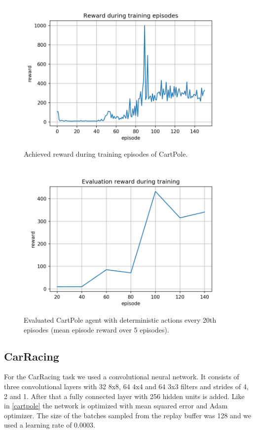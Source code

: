\documentclass[a4paper,12pt]{article}
\begin{document}
\begin{figure}[H]
	\centering \includegraphics[width=11.70cm, height=7.9cm]{plots/cartpole_episode_reward.png}
	\caption{
		\label{fig:cartpole_episode_reward}
		Achieved reward during training episodes of CartPole.
	}
\end{figure}

\begin{figure}[H]
	\centering \includegraphics[width=11.70cm, height=7.9cm]{plots/cartpole_evaluation_reward.png}
	\caption{
		\label{fig:cartpole_evaluation_reward}
		Evaluated CartPole agent with deterministic actions every 20th episodes (mean episode reward over 5 episodes).
	}
\end{figure}

\subsection{CarRacing}\label{carracing}

For the CarRacing task we used a convolutional neural network. It consists of three convolutional layers with 32 8x8, 64 4x4 and 64 3x3 filters and strides of 4, 2 and 1. After that a fully connected layer with 256 hidden units is added. Like in \autoref{cartpole} the network is optimized with mean squared error and Adam optimizer. The size of the batches sampled from the replay buffer was 128 and we used a learning rate of 0.0003. \\
\end{document}

